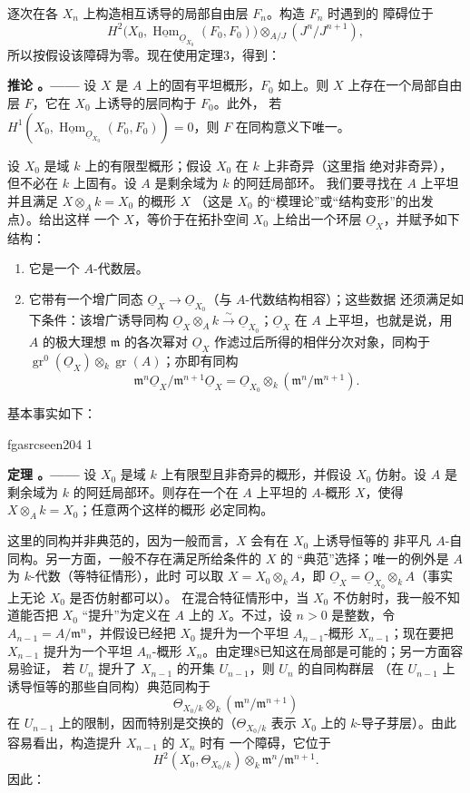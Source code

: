 \documentclass[12pt,twoside,openany]{book}
\numberwithin{equation}{section}
\newcommand{\fgaunitid}{unbound}
\newcommand{\src}[1]{%
  \phantomsection
  \hypertarget{src:\fgaunitid:#1}{}%
  \hypertarget{fga.\fgaunitid.p#1}{}%
  \ifcsname fgasrcseen#1\endcsname\else
    \expandafter\gdef\csname fgasrcseen#1\endcsname{1}%
    \hypertarget{src:#1}{}%
  \fi
  \marginpar{\raggedleft\footnotesize\sffamily #1}%
}
\newcommand{\Osh}{\underline{O}}
\newcommand{\Homsh}{\underline{\operatorname{Hom}}}
\newcommand{\fquote}[1]{“#1”}
\theoremstyle{plain}
\theoremstyle{definition}
\theoremstyle{remark}
\newcommand{\result}[2]{%
  \par\medskip\noindent\textbf{#1%
  \if\relax\detokenize{#2}\relax\else\space#2\fi。——}\enspace
}
\begin{document}
逐次在各 $X_n$ 上构造相互诱导的局部自由层 $F_n$。构造 $F_n$ 时遇到的
障碍位于
\[
  H^2\bigl(X_0,\Homsh_{\Osh_{X_0}}(F_0,F_0)\bigr)
  \otimes_{A/J}(J^n/J^{n+1}),
\]
所以按假设该障碍为零。现在使用定理3，得到：

\result{推论}{1} 设 $X$ 是 $A$ 上的固有平坦概形，$F_0$ 如上。则 $X$
上存在一个局部自由层 $F$，它在 $X_0$ 上诱导的层同构于 $F_0$。此外，
若 $H^1(X_0,\Homsh_{\Osh_{X_0}}(F_0,F_0))=0$，则 $F$ 在同构意义下唯一。

设 $X_0$ 是域 $k$ 上的有限型概形；假设 $X_0$ 在 $k$ 上非奇异（这里指
绝对非奇异），但不必在 $k$ 上固有。设 $A$ 是剩余域为 $k$ 的阿廷局部环。
我们要寻找在 $A$ 上平坦并且满足 $X\otimes_A k=X_0$ 的概形 $X$
（这是 $X_0$ 的\fquote{模理论}或\fquote{结构变形}的出发点）。给出这样
一个 $X$，等价于在拓扑空间 $X_0$ 上给出一个环层 $\Osh_X$，并赋予如下
结构：
\begin{enumerate}
  \item[\textit{i.}] 它是一个 $A$-代数层。
  \item[\textit{ii.}] 它带有一个增广同态
    $\Osh_X\longrightarrow\Osh_{X_0}$（与 $A$-代数结构相容）；这些数据
    还须满足如下条件：该增广诱导同构
    $\Osh_X\otimes_A k\xrightarrow{\sim}\Osh_{X_0}$；$\Osh_X$ 在 $A$
    上平坦，也就是说，用 $A$ 的极大理想 $\mathfrak m$ 的各次幂对
    $\Osh_X$ 作滤过后所得的相伴分次对象，同构于
    $\operatorname{gr}^0(\Osh_X)\otimes_k\operatorname{gr}(A)$；亦即有同构
    \[
      \mathfrak m^n\Osh_X/\mathfrak m^{n+1}\Osh_X
      =\Osh_{X_0}\otimes_k(\mathfrak m^n/\mathfrak m^{n+1}).
    \]
\end{enumerate}
基本事实如下：

\src{204}
\result{定理}{8} 设 $X_0$ 是域 $k$ 上有限型且非奇异的概形，并假设
$X_0$ 仿射。设 $A$ 是剩余域为 $k$ 的阿廷局部环。则存在一个在 $A$
上平坦的 $A$-概形 $X$，使得 $X\otimes_A k=X_0$；任意两个这样的概形
必定同构。

这里的同构并非典范的，因为一般而言，$X$ 会有在 $X_0$ 上诱导恒等的
非平凡 $A$-自同构。另一方面，一般不存在满足所给条件的 $X$ 的
\fquote{典范}选择；唯一的例外是 $A$ 为 $k$-代数（等特征情形），此时
可以取 $X=X_0\otimes_k A$，即
$\Osh_X=\Osh_{X_0}\otimes_k A$（事实上无论 $X_0$ 是否仿射都可以）。
在混合特征情形中，当 $X_0$ 不仿射时，我一般不知道能否把 $X_0$
\fquote{提升}为定义在 $A$ 上的 $X$。不过，设 $n>0$ 是整数，令
$A_{n-1}=A/\mathfrak m^n$，并假设已经把 $X_0$ 提升为一个平坦
$A_{n-1}$-概形 $X_{n-1}$；现在要把 $X_{n-1}$ 提升为一个平坦
$A_n$-概形 $X_n$。由定理8已知这在局部是可能的；另一方面容易验证，
若 $U_n$ 提升了 $X_{n-1}$ 的开集 $U_{n-1}$，则 $U_n$ 的自同构群层
（在 $U_{n-1}$ 上诱导恒等的那些自同构）典范同构于
\[
  \Theta_{X_0/k}\otimes_k(\mathfrak m^n/\mathfrak m^{n+1})
\]
在 $U_{n-1}$ 上的限制，因而特别是交换的（$\Theta_{X_0/k}$ 表示 $X_0$
上的 $k$-导子芽层）。由此容易看出，构造提升 $X_{n-1}$ 的 $X_n$ 时有
一个障碍，它位于
\[
  H^2(X_0,\Theta_{X_0/k})\otimes_k
  \mathfrak m^n/\mathfrak m^{n+1}.
\]
因此：
\end{document}
